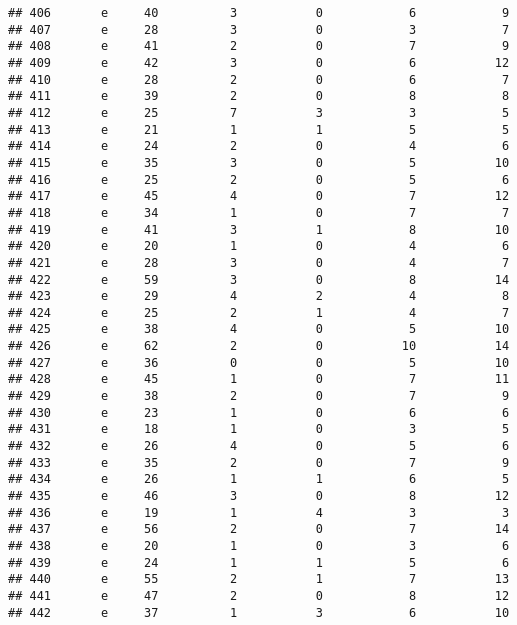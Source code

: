 \documentclass[
]{article}
\begin{document}
\begin{verbatim}
## 406       e     40          3           0            6            9
## 407       e     28          3           0            3            7
## 408       e     41          2           0            7            9
## 409       e     42          3           0            6           12
## 410       e     28          2           0            6            7
## 411       e     39          2           0            8            8
## 412       e     25          7           3            3            5
## 413       e     21          1           1            5            5
## 414       e     24          2           0            4            6
## 415       e     35          3           0            5           10
## 416       e     25          2           0            5            6
## 417       e     45          4           0            7           12
## 418       e     34          1           0            7            7
## 419       e     41          3           1            8           10
## 420       e     20          1           0            4            6
## 421       e     28          3           0            4            7
## 422       e     59          3           0            8           14
## 423       e     29          4           2            4            8
## 424       e     25          2           1            4            7
## 425       e     38          4           0            5           10
## 426       e     62          2           0           10           14
## 427       e     36          0           0            5           10
## 428       e     45          1           0            7           11
## 429       e     38          2           0            7            9
## 430       e     23          1           0            6            6
## 431       e     18          1           0            3            5
## 432       e     26          4           0            5            6
## 433       e     35          2           0            7            9
## 434       e     26          1           1            6            5
## 435       e     46          3           0            8           12
## 436       e     19          1           4            3            3
## 437       e     56          2           0            7           14
## 438       e     20          1           0            3            6
## 439       e     24          1           1            5            6
## 440       e     55          2           1            7           13
## 441       e     47          2           0            8           12
## 442       e     37          1           3            6           10

\end{verbatim}
\end{document}
